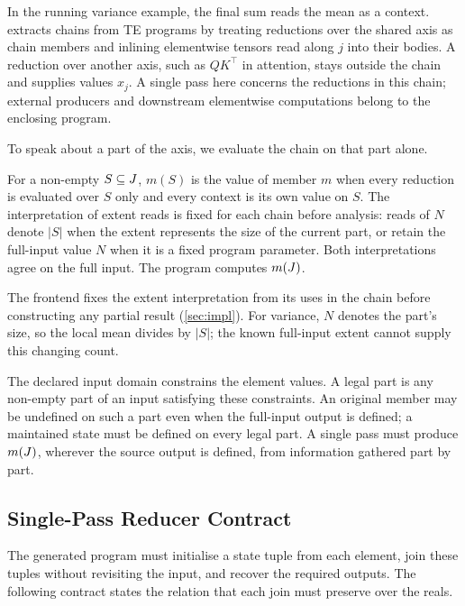 In the running variance example, the final sum reads the mean as a context.
\sys extracts chains from TE programs by treating reductions over the shared axis as chain members and inlining elementwise tensors read along $j$ into their bodies.
A reduction over another axis, such as $QK^\top$ in attention, stays outside the chain and supplies values $x_j$.
A single pass here concerns the reductions in this chain; external producers and downstream elementwise computations belong to the enclosing program.

To speak about a part of the axis, we evaluate the chain on that part alone.

\begin{definition}
\label{def:partial}
For a non-empty $S\subseteq J$, $m(S)$ is the value of member $m$ when every reduction is evaluated over $S$ only and every context is its own value on $S$.
The interpretation of extent reads is fixed for each chain before analysis: reads of $N$ denote $|S|$ when the extent represents the size of the current part, or retain the full-input value $N$ when it is a fixed program parameter.
Both interpretations agree on the full input.
The program computes $m(J)$.
\end{definition}

The frontend fixes the extent interpretation from its uses in the chain before constructing any partial result (\cref{sec:impl}).
For variance, $N$ denotes the part's size, so the local mean divides by $|S|$; the known full-input extent cannot supply this changing count.

The declared input domain constrains the element values.
A legal part is any non-empty part of an input satisfying these constraints.
An original member may be undefined on such a part even when the full-input output is defined; a maintained state must be defined on every legal part.
A single pass must produce $m(J)$, wherever the source output is defined, from information gathered part by part.

\subsection{Single-Pass Reducer Contract}

The generated program must initialise a state tuple from each element, join these tuples without revisiting the input, and recover the required outputs.
The following contract states the relation that each join must preserve over the reals.

